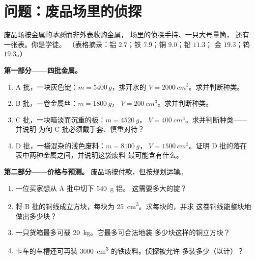 \section{问题：废品场里的侦探}

\begin{problem}\label{pb:g7:volume-mass-density:1}
废品场按金属的\emph{本质}而非外表收购金属，
场里的侦探手持、一只大号量筒，
还有一张表。你是学徒。
（表格摘录：铝 $2.7$；铁 $7.9$；铜 $9.0$；铅 $11.3$；
金 $19.3$；钨 $19.3$。）

\medskip\noindent\textbf{第一部分——四批金属。}
\begin{enumerate}
  \item A 批，一块灰色锭：$m = \qty{5400}{g}$，排开水的
        $V = \qty{2000}{cm^3}$。求并判断种类。
  \item B 批，一卷金属丝：$m = \qty{1800}{g}$，
        $V = \qty{200}{cm^3}$。求并判断种类。
  \item C 批，一块暗淡而沉重的板：$m = \qty{4520}{g}$，
        $V = \qty{400}{cm^3}$。求并判断种类——并说明
        为何 C 批必须戴手套、慎重对待？
  \item D 批，一袋混杂的浅色废料：$m = \qty{8100}{g}$，
        $V = \qty{1500}{cm^3}$。证明 D 批的落在
        表中两种金属之间，并说明这袋废料
        最可能含有什么。
\end{enumerate}

\medskip\noindent\textbf{第二部分——价格与预测。}
废品场按付款，但按规划运输。
\begin{enumerate}[resume]
  \item 一位买家想从 A 批中切下 \qty{540}{g} 铝。
        这需要多大的锭？
  \item 将 B 批的铜线成立方块，每块为
        \qty{25}{cm^3}。求每块的，并求
        这卷铜线能整块地做出多少块？
  \item 一只货箱最多可载 \qty{20}{kg}。它最多可合法地装
        多少块这样的铜立方块？
  \item 卡车的车槽还可再装 \qty{3000}{cm^3}
        的铁废料。侦探被允许
        多装多少（以计）？
\end{enumerate}


\end{problem}
